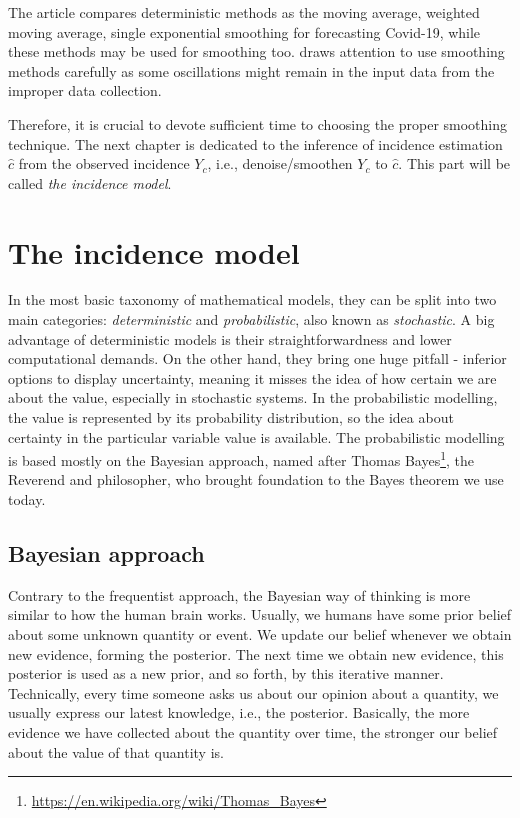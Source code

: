 \documentclass[
  digital, %
  oneside, %
  lof,     %
  lot,     %
]{fithesis4}
\begin{document}
The article \cite{elmousalami2020} compares deterministic methods as the moving average, weighted moving average, single exponential smoothing for forecasting Covid-19, while these methods may be used for smoothing too.
\cite{annunziato2020} draws attention to use smoothing methods carefully as some oscillations might remain in the input data from the improper data collection.

Therefore, it is crucial to devote sufficient time to choosing the proper smoothing technique.
The next chapter is dedicated to the inference of incidence estimation $\hat{c}$ from the observed incidence $Y_c$, i.e., denoise/smoothen $Y_c$ to $\hat{c}$. This part will be called \textit{the incidence model}.


\chapter{The incidence model}

In the most basic taxonomy of mathematical models, they can be split into two main categories: \textit{deterministic} and \textit{probabilistic}, also known as \textit{stochastic}. 
A big advantage of deterministic models is their straightforwardness and lower computational demands. 
On the other hand, they bring one huge pitfall - inferior options to display uncertainty, meaning it misses the idea of how certain we are about the value, especially in stochastic systems.
In the probabilistic modelling, the value is represented by its probability distribution, so the idea about certainty in the particular variable value is available.
The probabilistic modelling is based mostly on the Bayesian approach, named after Thomas Bayes\footnote{\url{https://en.wikipedia.org/wiki/Thomas_Bayes}}, the Reverend and philosopher, who brought foundation to the Bayes theorem we use today.


\section{Bayesian approach}

Contrary to the frequentist approach, the Bayesian way of thinking is more similar to how the human brain works. 
Usually, we humans have some prior belief about some unknown quantity or event. We update our belief whenever we obtain new evidence, forming the posterior.
The next time we obtain new evidence, this posterior is used as a new prior, and so forth, by this iterative manner.
Technically, every time someone asks us about our opinion about a quantity, we usually express our latest knowledge, i.e., the posterior.
Basically, the more evidence we have collected about the quantity over time, the stronger our belief about the value of that quantity is.
\end{document}

